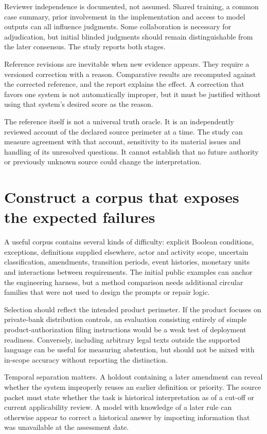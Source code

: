 \documentclass[12pt,a4paper,oneside,openany]{book}
\begin{document}
Reviewer independence is documented, not assumed. Shared training, a common case
summary, prior involvement in the implementation and access to model outputs can
all influence judgments. Some collaboration is necessary for adjudication, but
initial blinded judgments should remain distinguishable from the later consensus.
The study reports both stages.

Reference revisions are inevitable when new evidence appears. They require a
versioned correction with a reason. Comparative results are recomputed against
the corrected reference, and the report explains the effect. A correction that
favors one system is not automatically improper, but it must be justified without
using that system's desired score as the reason.

The reference itself is not a universal truth oracle. It is an independently
reviewed account of the declared source perimeter at a time. The study can measure
agreement with that account, sensitivity to its material issues and handling of
its unresolved questions. It cannot establish that no future authority or
previously unknown source could change the interpretation.

\section{Construct a corpus that exposes the expected failures}
\label{merge:M09:03}


A useful corpus contains several kinds of difficulty: explicit Boolean conditions,
exceptions, definitions supplied elsewhere, actor and activity scope, uncertain
classification, amendments, transition periods, event histories, monetary units
and interactions between requirements. The initial public examples can anchor the
engineering harness, but a method comparison needs additional circular families
that were not used to design the prompts or repair logic.

Selection should reflect the intended product perimeter. If the product focuses
on private-bank distribution controls, an evaluation consisting entirely of simple
product-authorization filing instructions would be a weak test of deployment
readiness. Conversely, including arbitrary legal texts outside the supported
language can be useful for measuring abstention, but should not be mixed with
in-scope accuracy without reporting the distinction.

Temporal separation matters. A holdout containing a later amendment can reveal
whether the system improperly reuses an earlier definition or priority. The
source packet must state whether the task is historical interpretation as of a
cut-off or current applicability review. A model with knowledge of a later rule
can otherwise appear to correct a historical answer by importing information
that was unavailable at the assessment date.
\end{document}

